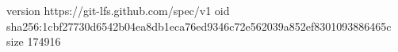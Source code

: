 version https://git-lfs.github.com/spec/v1
oid sha256:1cbf27730d6542b04ea8db1eca76ed9346c72e562039a852ef8301093886465c
size 174916
